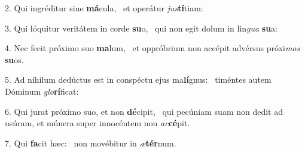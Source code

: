2. Qui ingréditur sine \textbf{má}cula, \ast\  et operátur \textit{jus}\textbf{tí}tiam:\

3. Qui lóquitur veritátem in corde \textbf{su}o, \ast\  qui non egit dolum in lin\textit{gua} \textbf{su}a:\

4. Nec fecit próximo suo \textbf{ma}lum, \ast\  et oppróbrium non accépit advérsus próxi\textit{mos} \textbf{su}os.\

5. Ad níhilum dedúctus est in conspéctu ejus ma\textbf{lí}gnus: \ast\  timéntes autem Dóminum \textit{glo}\textbf{rí}ficat:\

6. Qui jurat próximo suo, et non \textbf{dé}cipit, \ast\  qui pecúniam suam non dedit ad usúram, et múnera super innocéntem non \textit{ac}\textbf{cé}pit.\

7. Qui \textbf{fa}cit hæc: \ast\  non movébitur in \textit{æ}\textbf{tér}num.\

